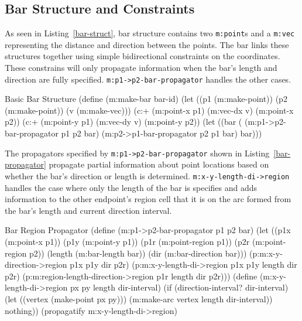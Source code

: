 \subsection{Bar Structure and Constraints}

As seen in Listing~\ref{bar-struct}, bar structure contains two
\texttt{m:point}s and a \texttt{m:vec} representing the distance and
direction between the points. The bar links these structures together
using simple bidirectional constraints on the coordinates. These
constrains will only propagate information when the bar's length and
direction are fully specified. \texttt{m:p1->p2-bar-propagator}
handles the other cases.

\begin{code-listing}
[label=bar-struct]
{Basic Bar Structure}
(define (m:make-bar bar-id)
  (let ((p1 (m:make-point))
        (p2 (m:make-point))
        (v (m:make-vec)))
    (c:+ (m:point-x p1) (m:vec-dx v)
         (m:point-x p2))
    (c:+ (m:point-y p1) (m:vec-dy v)
         (m:point-y p2))
    (let ((bar (%
      (m:p1->p2-bar-propagator p1 p2 bar)
      (m:p2->p1-bar-propagator p2 p1 bar)
      bar)))
\end{code-listing}

The propagators specified by \texttt{m:p1->p2-bar-propagator} shown in
Listing~\ref{bar-propagator} propagate partial information about point
locations based on whether the bar's direction or length is
determined. \texttt{m:x-y-length-di->region} handles the case where
only the length of the bar is specifies and adds information to the
other endpoint's region cell that it is on the arc formed from the
bar's length and current direction interval.

\begin{code-listing}
[label=bar-propagator]
{Bar Region Propagator}
(define (m:p1->p2-bar-propagator p1 p2 bar)
  (let ((p1x (m:point-x p1))
        (p1y (m:point-y p1))
        (p1r (m:point-region p1))
        (p2r (m:point-region p2))
        (length (m:bar-length bar))
        (dir (m:bar-direction bar)))
    (p:m:x-y-direction->region p1x p1y dir p2r)
    (p:m:x-y-length-di->region p1x p1y length dir p2r)
    (p:m:region-length-direction->region p1r length dir p2r)))
(define (m:x-y-length-di->region px py length dir-interval)
  (if (direction-interval? dir-interval)
      (let ((vertex (make-point px py)))
        (m:make-arc vertex length dir-interval))
      nothing))
(propagatify m:x-y-length-di->region)
\end{code-listing}

